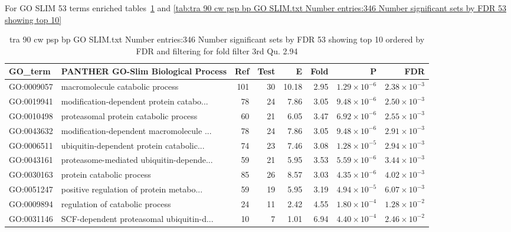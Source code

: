 For GO SLIM 53 terms enriched tables~\ref{tab:tra 90 cw psp bp GO SLIM.txt Number entries:346 Number significant sets by FDR 53 showing top 10 ordered by FDR and filtering for fold filter 3rd Qu. 2.94} and 
\ref{tab:tra 90 cw psp bp GO SLIM.txt Number entries:346 Number significant sets by FDR 53 showing top 10}

\begin{table}[ht]
\centering
\begin{adjustbox}{width=\textwidth}
\begin{tabular}{llrrrrrr}
  \hline
GO\_term & PANTHER GO-Slim Biological Process & Ref & Test & E & Fold & P & FDR \\ 
  \hline
GO:0009057 & macromolecule catabolic process  & 101 & 30 & 10.18 & 2.95 & $1.29 \times 10^{-6}$ & $2.38 \times 10^{-3}$ \\ 
  GO:0019941 & modification-dependent protein catabo... & 78 & 24 & 7.86 & 3.05 & $9.48 \times 10^{-6}$ & $2.50 \times 10^{-3}$ \\ 
  GO:0010498 & proteasomal protein catabolic process  & 60 & 21 & 6.05 & 3.47 & $6.92 \times 10^{-6}$ & $2.55 \times 10^{-3}$ \\ 
  GO:0043632 & modification-dependent macromolecule ... & 78 & 24 & 7.86 & 3.05 & $9.48 \times 10^{-6}$ & $2.91 \times 10^{-3}$ \\ 
  GO:0006511 & ubiquitin-dependent protein catabolic... & 74 & 23 & 7.46 & 3.08 & $1.28 \times 10^{-5}$ & $2.94 \times 10^{-3}$ \\ 
  GO:0043161 & proteasome-mediated ubiquitin-depende... & 59 & 21 & 5.95 & 3.53 & $5.59 \times 10^{-6}$ & $3.44 \times 10^{-3}$ \\ 
  GO:0030163 & protein catabolic process  & 85 & 26 & 8.57 & 3.03 & $4.35 \times 10^{-6}$ & $4.02 \times 10^{-3}$ \\ 
  GO:0051247 & positive regulation of protein metabo... & 59 & 19 & 5.95 & 3.19 & $4.94 \times 10^{-5}$ & $6.07 \times 10^{-3}$ \\ 
  GO:0009894 & regulation of catabolic process  & 24 & 11 & 2.42 & 4.55 & $1.80 \times 10^{-4}$ & $1.28 \times 10^{-2}$ \\ 
  GO:0031146 & SCF-dependent proteasomal ubiquitin-d... & 10 & 7 & 1.01 & 6.94 & $4.40 \times 10^{-4}$ & $2.46 \times 10^{-2}$ \\ 
  \hline
\end{tabular}
\end{adjustbox}
\caption{tra 90 cw psp bp GO SLIM.txt Number entries:346 Number significant sets by FDR 53 showing top 10 ordered by FDR and filtering for fold filter 3rd Qu. 2.94} 
\label{tab:tra 90 cw psp bp GO SLIM.txt Number entries:346 Number significant sets by FDR 53 showing top 10 ordered by FDR and filtering for fold filter 3rd Qu. 2.94}
\end{table}


